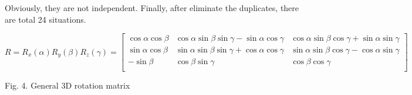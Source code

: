 Obviously, they are not independent. Finally, after eliminate the duplicates, there are total 24 situations.
\begin{center}
$R=R_{x}(\alpha)R_{y}(\beta)R_{z}(\gamma)=
\begin{bmatrix}
\cos\alpha\cos\beta&\cos\alpha\sin\beta\sin\gamma-\sin\alpha\cos\gamma&\cos\alpha\sin\beta\cos\gamma+\sin\alpha\sin\gamma\\
\sin\alpha\cos\beta&\sin\alpha\sin\beta\sin\gamma+\cos\alpha\cos\gamma&\sin\alpha\sin\beta\cos\gamma-\cos\alpha\sin\gamma\\
         -\sin\beta&                               \cos\beta\sin\gamma&\cos\beta\cos\gamma\\
\end{bmatrix}
$
\end{center}
\begin{center}
Fig. 4. General 3D rotation matrix
\end{center}




  


